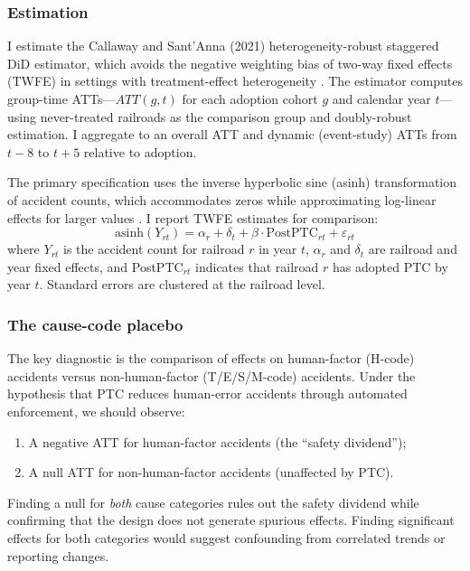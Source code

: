 \documentclass[12pt]{article}
\begin{document}
\subsubsection*{Estimation} I estimate the Callaway and Sant'Anna (2021) heterogeneity-robust staggered DiD estimator, which avoids the negative weighting bias of two-way fixed effects (TWFE) in settings with treatment-effect heterogeneity \citep{GoodmanBacon2021, SunAbraham2021, deChaisemartin2020}. The estimator computes group-time ATTs---$ATT(g,t)$ for each adoption cohort $g$ and calendar year $t$---using never-treated railroads as the comparison group and doubly-robust estimation. I aggregate to an overall ATT and dynamic (event-study) ATTs from $t-8$ to $t+5$ relative to adoption.

The primary specification uses the inverse hyperbolic sine (asinh) transformation of accident counts, which accommodates zeros while approximating log-linear effects for larger values \citep{Bellemare2020Asinh}. I report TWFE estimates for comparison:
\begin{equation}
\text{asinh}(Y_{rt}) = \alpha_r + \delta_t + \beta \cdot \text{PostPTC}_{rt} + \varepsilon_{rt}
\end{equation}
where $Y_{rt}$ is the accident count for railroad $r$ in year $t$, $\alpha_r$ and $\delta_t$ are railroad and year fixed effects, and PostPTC$_{rt}$ indicates that railroad $r$ has adopted PTC by year $t$. Standard errors are clustered at the railroad level.

\subsubsection*{The cause-code placebo} The key diagnostic is the comparison of effects on human-factor (H-code) accidents versus non-human-factor (T/E/S/M-code) accidents. Under the hypothesis that PTC reduces human-error accidents through automated enforcement, we should observe:
\begin{enumerate}
    \item A negative ATT for human-factor accidents (the ``safety dividend'');
    \item A null ATT for non-human-factor accidents (unaffected by PTC).
\end{enumerate}
Finding a null for \textit{both} cause categories rules out the safety dividend while confirming that the design does not generate spurious effects. Finding significant effects for both categories would suggest confounding from correlated trends or reporting changes.
\end{document}
